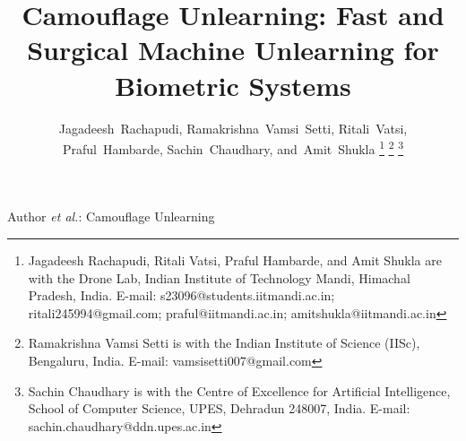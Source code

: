 \documentclass[journal]{IEEEtran}
\begin{document}
\title{Camouflage Unlearning: Fast and Surgical Machine 
Unlearning for Biometric Systems}

\author{Jagadeesh~Rachapudi,
        Ramakrishna~Vamsi~Setti,
        Ritali~Vatsi,
        Praful~Hambarde,
        Sachin~Chaudhary,
        and~Amit~Shukla%
\thanks{Jagadeesh Rachapudi, Ritali Vatsi, Praful Hambarde, and Amit Shukla are
        with the Drone Lab, Indian Institute of Technology Mandi, Himachal Pradesh,
        India. E-mail: s23096@students.iitmandi.ac.in; ritali245994@gmail.com;
        praful@iitmandi.ac.in; amitshukla@iitmandi.ac.in}
\thanks{Ramakrishna Vamsi Setti is with the Indian Institute of Science (IISc),
        Bengaluru, India. E-mail: vamsisetti007@gmail.com}
\thanks{Sachin Chaudhary is with the Centre of Excellence for Artificial
        Intelligence, School of Computer Science, UPES, Dehradun 248007,
        India. E-mail: sachin.chaudhary@ddn.upes.ac.in}
}

%
{Author \MakeLowercase{\textit{et al.}}: Camouflage Unlearning}

\maketitle












\end{document}
